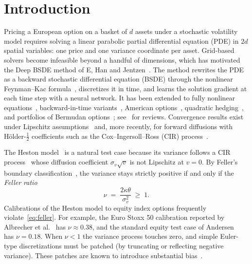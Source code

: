 \section{Introduction}\label{sec:intro}

Pricing a European option on a basket of $d$ assets under a stochastic volatility model requires solving a linear parabolic partial differential equation (PDE) in $2d$ spatial variables: one price and one variance coordinate per asset. Grid-based solvers become infeasible beyond a handful of dimensions, which has motivated the Deep BSDE method of E, Han and Jentzen~\cite{e2017deep,han2018solving}. The method rewrites the PDE as a backward stochastic differential equation (BSDE) through the nonlinear Feynman--Kac formula~\cite{pardoux1990adapted,elkaroui1997backward}, discretizes it in time, and learns the solution gradient at each time step with a neural network. It has been extended to fully nonlinear equations~\cite{beck2019machine}, backward-in-time variants~\cite{hure2020deep}, American options~\cite{chen2021deep}, quadratic hedging~\cite{gnoatto2025deep}, and portfolios of Bermudan options~\cite{negyesi2026deep}; see~\cite{germain2021neural,ruf2020neural} for reviews. Convergence results exist under Lipschitz assumptions~\cite{han2020convergence} and, more recently, for forward diffusions with H\"older-$\tfrac12$ coefficients such as the Cox--Ingersoll--Ross (CIR) process~\cite{jiang2021convergence}.

The Heston model~\cite{heston1993} is a natural test case because its variance follows a CIR process~\cite{cox1985theory} whose diffusion coefficient $\sigma_v\sqrt{v}$ is not Lipschitz at $v=0$. By Feller's boundary classification~\cite{feller1951two}, the variance stays strictly positive if and only if the \emph{Feller ratio}
\begin{equation}\label{eq:feller}
  \nu \;=\; \frac{2\kappa\theta}{\sigma_v^{2}} \;\ge\; 1 .
\end{equation}
Calibrations of the Heston model to equity index options frequently violate~\eqref{eq:feller}. For example, the Euro Stoxx 50 calibration reported by Albrecher et al.~\cite{albrecher2007little} has $\nu\approx0.38$, and the standard equity test case of Andersen~\cite{andersen2008simple} has $\nu=0.18$. When $\nu<1$ the variance process touches zero, and simple Euler-type discretizations must be patched (by truncating or reflecting negative variance). These patches are known to introduce substantial bias~\cite{higham2005convergence,lord2010comparison,andersen2008simple,alfonsi2005discretization}.

